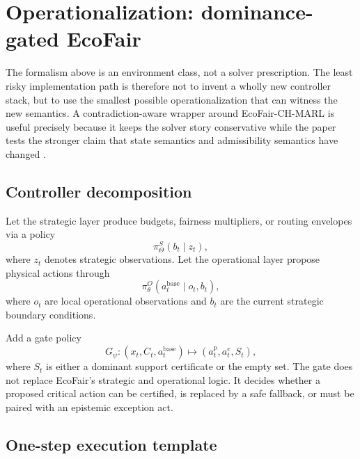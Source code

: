 \documentclass[11pt]{article}
\newcommand{\1}{\mathbf{1}}
\theoremstyle{definition}
\theoremstyle{plain}
\theoremstyle{remark}
\begin{document}
\section{Operationalization: dominance-gated EcoFair}\label{supp:sec:operationalization}
\label{supp:sec:controller}

The formalism above is an environment class, not a solver prescription. The least risky implementation path is therefore not to invent a wholly new controller stack, but to use the smallest possible operationalization that can witness the new semantics. A contradiction-aware wrapper around EcoFair-CH-MARL is useful precisely because it keeps the solver story conservative while the paper tests the stronger claim that state semantics and admissibility semantics have changed \citep{Alqithami2026EcoFair}.

\subsection{Controller decomposition}

Let the strategic layer produce budgets, fairness multipliers, or routing envelopes via a policy
\[
\pi^{S}_{\Theta}(b_t\mid z_t),
\]
where $z_t$ denotes strategic observations. Let the operational layer propose physical actions through
\[
\pi^{O}_{\theta}(a_t^{\mathrm{base}}\mid o_t,b_t),
\]
where $o_t$ are local operational observations and $b_t$ are the current strategic boundary conditions.

Add a gate policy
\[
G_{\psi}:(x_t,C_t,a_t^{\mathrm{base}})\mapsto (a_t^p,a_t^e,S_t),
\]
where $S_t$ is either a dominant support certificate or the empty set. The gate does not replace EcoFair's strategic and operational logic. It decides whether a proposed critical action can be certified, is replaced by a safe fallback, or must be paired with an epistemic exception act.

\subsection{One-step execution template}
\end{document}
